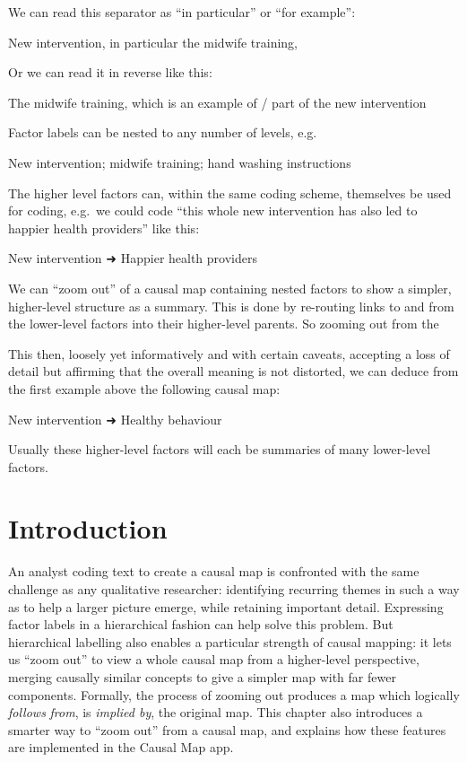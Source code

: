 \documentclass[
]{book}
\begin{document}
We can read this separator as ``in particular'' or ``for example'':

New intervention, in particular the midwife training,

Or we can read it in reverse like this:

The midwife training, which is an example of / part of the new intervention

Factor labels can be nested to any number of levels, e.g.

New intervention; midwife training; hand washing instructions

The higher level factors can, within the same coding scheme, themselves be used for coding, e.g.~we could code ``this whole new intervention has also led to happier health providers'' like this:

New intervention ➜ Happier health providers

We can ``zoom out'' of a causal map containing nested factors to show a simpler, higher-level structure as a summary. This is done by re-routing links to and from the lower-level factors into their higher-level parents. So zooming out from the

This then, loosely yet informatively and with certain caveats, accepting a loss of detail but affirming that the overall meaning is not distorted, we can deduce from the first example above the following causal map:

New intervention ➜ Healthy behaviour

Usually these higher-level factors will each be summaries of many lower-level factors.

\hypertarget{introduction}{%
\section{Introduction}\label{introduction}}

An analyst coding text to create a causal map is confronted with the same challenge as any qualitative researcher: identifying recurring themes in such a way as to help a larger picture emerge, while retaining important detail. Expressing factor labels in a hierarchical fashion can help solve this problem. But hierarchical labelling also enables a particular strength of causal mapping: it lets us ``zoom out'' to view a whole causal map from a higher-level perspective, merging causally similar concepts to give a simpler map with far fewer components. Formally, the process of zooming out produces a map which logically \emph{follows} \emph{from}, is \emph{implied by}, the original map. This chapter also introduces a smarter way to ``zoom out'' from a causal map, and explains how these features are implemented in the Causal Map app.
\end{document}
